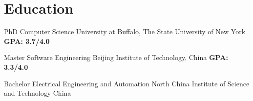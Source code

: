 \section{Education}
{PhD}
{Computer Science}
{University at Buffalo, The State University of New York}
{\textbf{GPA: 3.7/4.0}}
{}

{Master}
{Software Engineering}
{Beijing Institute of Technology, China}
{\textbf{GPA: 3.3/4.0}}
{}

{Bachelor}
{Electrical Engineering and Automation}
{North China Institute of Science and Technology}
{China}
{}

